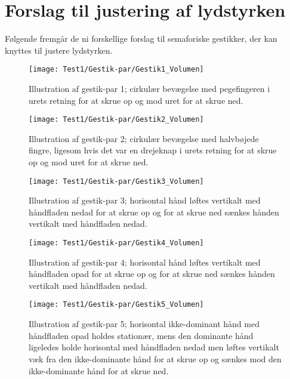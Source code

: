 \section{Forslag til justering af lydstyrken}
\label{app:ForslagVolumen}
%
Følgende fremgår de ni forskellige forslag til semaforiske gestikker, der kan knyttes til justere lydstyrken.
%
\begin{figure}[H]
	\centering
	\texttt{[image: Test1/Gestik-par/Gestik1\_Volumen]}
	\caption{Illustration af gestik-par 1; cirkulær bevægelse med pegefingeren i urets retning for at skrue op og mod uret for at skrue ned.}
	\label{fig:GestikPar1VolumenApp}
\end{figure}
\noindent
%
%
\begin{figure}[H]
	\centering
	\texttt{[image: Test1/Gestik-par/Gestik2\_Volumen]}
	\caption{Illustration af gestik-par 2; cirkulær bevægelse med halvbøjede fingre, ligesom hvis det var en drejeknap i urets retning for at skrue op og mod uret for at skrue ned.}
	\label{fig:GestikPar2VolumenApp}
\end{figure}
\noindent
%
%
\begin{figure}[H]
	\centering
	\texttt{[image: Test1/Gestik-par/Gestik3\_Volumen]}
	\caption{Illustration af gestik-par 3; horisontal hånd løftes vertikalt med håndfladen nedad for at skrue op og for at skrue ned sænkes hånden vertikalt med håndfladen nedad.}
	\label{fig:GestikPar3VolumenApp}
\end{figure}
\noindent
%
%
\begin{figure}[H]
	\centering
	\texttt{[image: Test1/Gestik-par/Gestik4\_Volumen]}
	\caption{Illustration af gestik-par 4; horisontal hånd løftes vertikalt med håndfladen opad for at skrue op og for at skrue ned sænkes hånden vertikalt med håndfladen nedad.}
	\label{fig:GestikPar4VolumenApp}
\end{figure}
\noindent
%
%
\begin{figure}[H]
	\centering
	\texttt{[image: Test1/Gestik-par/Gestik5\_Volumen]}
	\caption{Illustration af gestik-par 5; horisontal ikke-dominant hånd med håndfladen opad holdes stationær, mens den dominante hånd ligeledes holde horisontal med håndfladen nedad men løftes vertikalt væk fra den ikke-dominante hånd for at skrue op og sænkes mod den ikke-dominante hånd for at skrue ned.}
	\label{fig:GestikPar5VolumenApp}
\end{figure}
